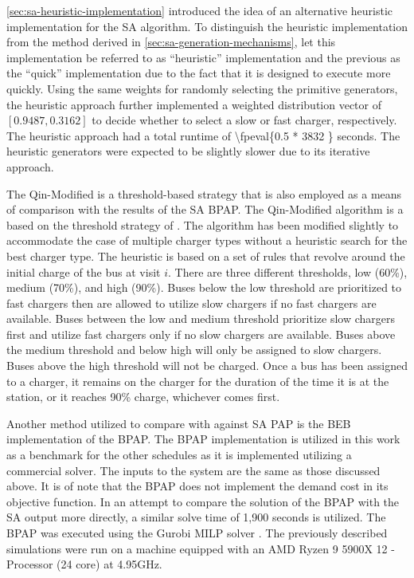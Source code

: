 \documentclass[energies,article,submit,moreauthors]{Definitions/mdpi}
\newcommand{\tempcnt}{3832 }                                                    %
\newcommand{\heuristiclocal}{0.5 }                                              %
\begin{document}
\ref{sec:sa-heuristic-implementation} introduced the idea of an alternative heuristic implementation for the SA algorithm. To
distinguish the heuristic implementation from the method derived in \ref{sec:sa-generation-mechanisms}, let this
implementation be referred to as ``heuristic'' implementation and the previous as the ``quick'' implementation due to the
fact that it is designed to execute more quickly. Using the same weights for randomly selecting the primitive
generators, the heuristic approach further implemented a weighted distribution vector of \([0.9487, 0.3162]\) to decide
whether to select a slow or fast charger, respectively. The heuristic approach had a total runtime of
\num{\fpeval{\heuristiclocal * \tempcnt}} seconds. The heuristic generators were expected to be slightly
slower due to its iterative approach.

The Qin-Modified is a threshold-based strategy that is also employed as a means of comparison with the results of the SA
BPAP. The Qin-Modified algorithm is a based on the threshold strategy of \cite{qin-2016-numer-analy}. The algorithm has
been modified slightly to accommodate the case of multiple charger types without a heuristic search for the best charger
type. The heuristic is based on a set of rules that revolve around the initial charge of the bus at visit \(i\). There are
three different thresholds, low (60\%), medium (70\%), and high (90\%). Buses below the low threshold are prioritized to
fast chargers then are allowed to utilize slow chargers if no fast chargers are available. Buses between the low and
medium threshold prioritize slow chargers first and utilize fast chargers only if no slow chargers are available. Buses
above the medium threshold and below high will only be assigned to slow chargers. Buses above the high threshold will
not be charged. Once a bus has been assigned to a charger, it remains on the charger for the duration of the time it is
at the station, or it reaches 90\% charge, whichever comes first.

Another method utilized to compare with against SA PAP is the BEB implementation of the BPAP. The BPAP implementation is
utilized in this work as a benchmark for the other schedules as it is implemented utilizing a commercial solver. The
inputs to the system are the same as those discussed above. It is of note that the BPAP does not implement the demand
cost in its objective function. In an attempt to compare the solution of the BPAP with the SA output more directly, a
similar solve time of 1,900 seconds is utilized. The BPAP was executed using the Gurobi MILP solver
\cite{gurobi-2021-gurob-optim}. The previously described simulations were run on a machine equipped with an AMD Ryzen 9
5900X 12 - Processor (24 core) at 4.95GHz.
\end{document}
